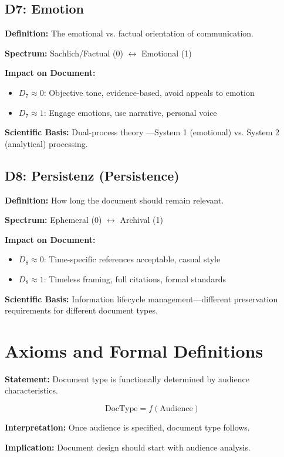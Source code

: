 \subsection{D7: Emotion}

\textbf{Definition:} The emotional vs. factual orientation of communication.

\textbf{Spectrum:} Sachlich/Factual (0) $\leftrightarrow$ Emotional (1)

\textbf{Impact on Document:}
\begin{itemize}[nosep]
\item $D_7 \approx 0$: Objective tone, evidence-based, avoid appeals to emotion
\item $D_7 \approx 1$: Engage emotions, use narrative, personal voice
\end{itemize}

\textbf{Scientific Basis:} Dual-process theory \citep{kahneman2011}---System 1
(emotional) vs. System 2 (analytical) processing.

\subsection{D8: Persistenz (Persistence)}

\textbf{Definition:} How long the document should remain relevant.

\textbf{Spectrum:} Ephemeral (0) $\leftrightarrow$ Archival (1)

\textbf{Impact on Document:}
\begin{itemize}[nosep]
\item $D_8 \approx 0$: Time-specific references acceptable, casual style
\item $D_8 \approx 1$: Timeless framing, full citations, formal standards
\end{itemize}

\textbf{Scientific Basis:} Information lifecycle management---different
preservation requirements for different document types.


\section{Axioms and Formal Definitions}
\label{sec:doctype-theory-axioms}

\begin{tcolorbox}[colback=gray!5!white, colframe=gray!75!black,
    title=Axiom DT-1: Audience Primacy]
\textbf{Statement:} Document type is functionally determined by audience characteristics.

\begin{equation}
\text{DocType} = f(\text{Audience})
\end{equation}

\textbf{Interpretation:} Once audience is specified, document type follows.

\textbf{Implication:} Document design should start with audience analysis.
\end{tcolorbox}


